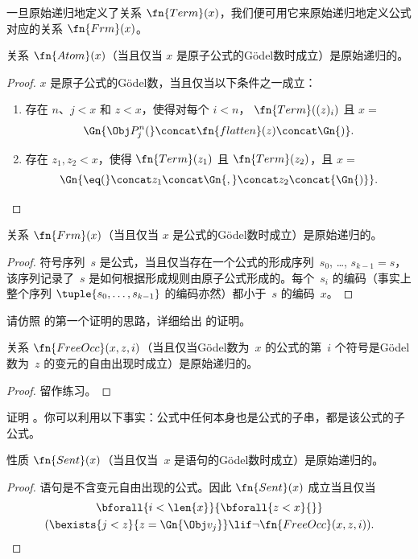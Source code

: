 \documentclass[../../../include/open-logic-section]{subfiles}
\begin{document}

一旦原始递归地定义了关系 $\fn{Term}(x)$，我们便可用它来原始递归地定义公式对应的关系 $\fn{Frm}(x)$。

\begin{prop}
关系 $\fn{Atom}(x)$（当且仅当 $x$ 是原子公式的Gödel数时成立）是原始递归的。
\end{prop}

\begin{proof}
$x$ 是原子公式的Gödel数，当且仅当以下条件之一成立：
\begin{enumerate}
\item 存在 $n$、$j < x$ 和 $z < x$，使得对每个 $i < n$，
  $\fn{Term}((z)_i)$ 且 $x = $
\[
\Gn{\Obj P^n_j(} \concat \fn{flatten}(z) \concat \Gn{)}.
\]
\item 存在 $z_1, z_2 < x$，使得 $\fn{Term}(z_1)$ 且
  $\fn{Term}(z_2)$，且 $x = $
\[
\Gn{{\eq}(} \concat z_1 \concat \Gn{,} \concat z_2 \concat{\Gn{)}}.
\]
\end{enumerate}
\end{proof}

\begin{prop}
关系 $\fn{Frm}(x)$（当且仅当 $x$ 是公式的Gödel数时成立）是原始递归的。
\end{prop}

\begin{proof}
符号序列~$s$ 是公式，当且仅当存在一个公式的形成序列~$s_0$, \dots, $s_{k-1} = s$，该序列记录了~$s$ 是如何根据形成规则由原子公式形成的。每个~$s_i$ 的编码（事实上整个序列 $\tuple{s_0, \dots, s_{k-1}}$ 的编码亦然）都小于~$s$ 的编码~$x$。
\end{proof}

\begin{prob}
请仿照  的第一个证明的思路，详细给出  的证明。
\end{prob}

\begin{prop}
关系 $\fn{FreeOcc}(x, z, i)$（当且仅当Gödel数为~$x$ 的公式的第~$i$ 个符号是Gödel数为~$z$ 的变元的自由出现时成立）是原始递归的。
\end{prop}

\begin{proof}
留作练习。
\end{proof}

\begin{prob}
证明 。你可以利用以下事实：公式中任何本身也是公式的子串，都是该公式的子公式。
\end{prob}

\begin{prop}
性质 $\fn{Sent}(x)$（当且仅当~$x$ 是语句的Gödel数时成立）是原始递归的。
\end{prop}

\begin{proof}
语句是不含变元自由出现的公式。因此 $\fn{Sent}(x)$ 成立当且仅当
\begin{multline*}
\bforall{i<\len{x}}{\bforall{z<x}{}}\\
(\bexists{j<z}{z=\Gn{\Obj v_j}} \lif \lnot\fn{FreeOcc}(x,z,i)).
\end{multline*}
\end{proof}
\end{document}
